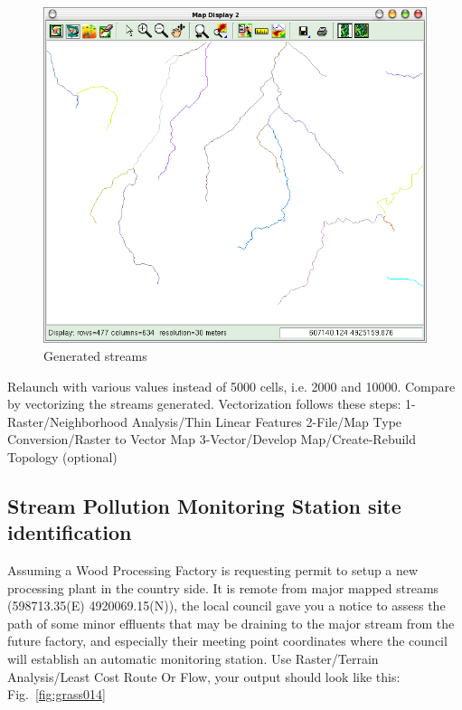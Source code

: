 \begin{figure}[htbp]
   \centering
   \includegraphics[scale=0.35]{grass013.png}
   \caption{Generated streams}
   \label{fig:grass013}
\end{figure}

Relaunch with various values instead of 5000 cells, i.e. 2000 and 10000.
Compare by vectorizing the streams generated. Vectorization follows
these steps:
1-Raster/Neighborhood Analysis/Thin Linear Features
2-File/Map Type Conversion/Raster to Vector Map
3-Vector/Develop Map/Create-Rebuild Topology (optional)

\subsection{Stream Pollution Monitoring Station site identification}
Assuming a Wood Processing Factory is requesting permit to setup a new processing plant in the country side. It is remote from major mapped streams (598713.35(E) 4920069.15(N)), the local council gave you a notice to assess the path of some minor effluents that may be draining to the major stream from the future factory, and especially their meeting point coordinates where the council will establish an automatic monitoring station.
Use Raster/Terrain Analysis/Least Cost Route Or Flow, your output should look like this: Fig.~\ref{fig:grass014}

